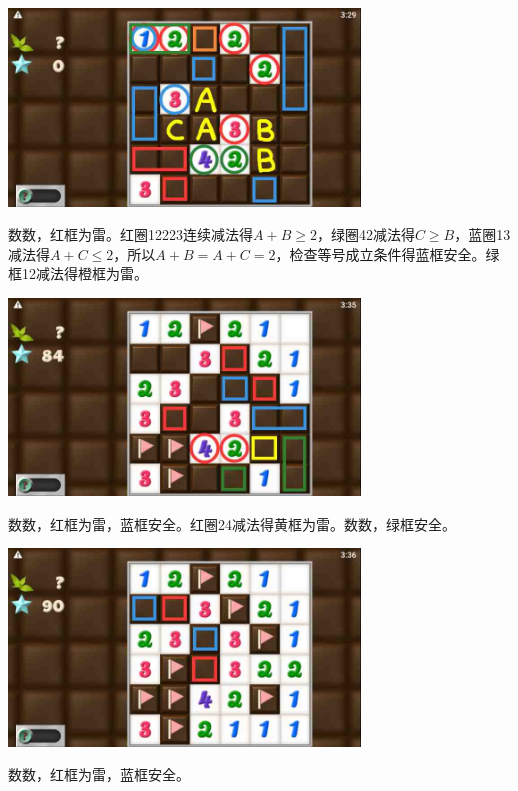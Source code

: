 \subsection{} %
\begin{center}
    \includegraphics[width=0.7\textwidth]{puzzlelow/241-1.jpg}
\end{center}
数数，红框为雷。红圈12223连续减法得$A+B\ge 2$，绿圈42减法得$C\ge B$，蓝圈13减法得$A+C\le 2$，所以$A+B=A+C=2$，检查等号成立条件得蓝框安全。绿框12减法得橙框为雷。
\begin{center}
    \includegraphics[width=0.7\textwidth]{puzzlelow/241-2.jpg}
\end{center}
数数，红框为雷，蓝框安全。红圈24减法得黄框为雷。数数，绿框安全。
\begin{center}
    \includegraphics[width=0.7\textwidth]{puzzlelow/241-3.jpg}
\end{center}
数数，红框为雷，蓝框安全。

